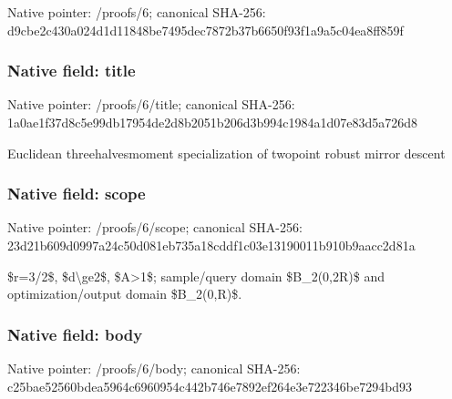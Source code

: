 \documentclass[10pt,a4paper]{article}
\begin{document}
Native pointer: /proofs/6; canonical SHA-256: d9cbe2c430a024d1d11848be\allowbreak{}7495dec7872b37b6650f93f1\allowbreak{}a9a5c04ea8ff859f



\subsubsection{Native field: title}


Native pointer: /proofs/6/title; canonical SHA-256: 1a0ae1f37d8c5e99db17954d\allowbreak{}e2d8b2051b206d3b994c1984\allowbreak{}a1d07e83d5a726d8


Euclidean threehalvesmoment specialization of twopoint robust mirror descent


\subsubsection{Native field: scope}


Native pointer: /proofs/6/scope; canonical SHA-256: 23d21b609d0997a24c50d081\allowbreak{}eb735a18cddf1c03e1319001\allowbreak{}1b910b9aacc2d81a


\$r=3/2\$, \$d\textbackslash{}ge2\$, \$A>1\$; sample/query domain \$B\_2(0,2R)\$ and optimization/output domain \$B\_2(0,R)\$.


\subsubsection{Native field: body}


Native pointer: /proofs/6/body; canonical SHA-256: c25bae52560bdea5964c6960\allowbreak{}954c442b746e7892ef264e3e\allowbreak{}722346be7294bd93
\end{document}
